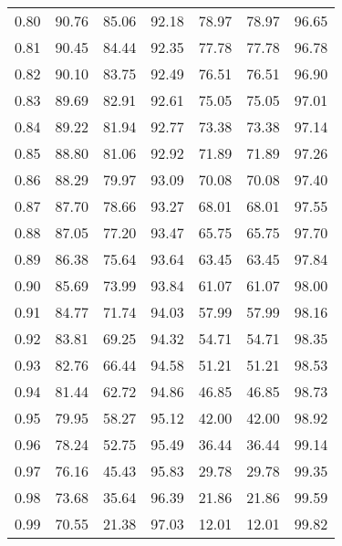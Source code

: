 \begin{tabular}{|c|c|c|c|c|c|c|}
      0.80 &     90.76 &     85.06 &      92.18 &   78.97 &      78.97 &         96.65 \\
      0.81 &     90.45 &     84.44 &      92.35 &   77.78 &      77.78 &         96.78 \\
      0.82 &     90.10 &     83.75 &      92.49 &   76.51 &      76.51 &         96.90 \\
      0.83 &     89.69 &     82.91 &      92.61 &   75.05 &      75.05 &         97.01 \\
      0.84 &     89.22 &     81.94 &      92.77 &   73.38 &      73.38 &         97.14 \\
      0.85 &     88.80 &     81.06 &      92.92 &   71.89 &      71.89 &         97.26 \\
      0.86 &     88.29 &     79.97 &      93.09 &   70.08 &      70.08 &         97.40 \\
      0.87 &     87.70 &     78.66 &      93.27 &   68.01 &      68.01 &         97.55 \\
      0.88 &     87.05 &     77.20 &      93.47 &   65.75 &      65.75 &         97.70 \\
      0.89 &     86.38 &     75.64 &      93.64 &   63.45 &      63.45 &         97.84 \\
      0.90 &     85.69 &     73.99 &      93.84 &   61.07 &      61.07 &         98.00 \\
      0.91 &     84.77 &     71.74 &      94.03 &   57.99 &      57.99 &         98.16 \\
      0.92 &     83.81 &     69.25 &      94.32 &   54.71 &      54.71 &         98.35 \\
      0.93 &     82.76 &     66.44 &      94.58 &   51.21 &      51.21 &         98.53 \\
      0.94 &     81.44 &     62.72 &      94.86 &   46.85 &      46.85 &         98.73 \\
      0.95 &     79.95 &     58.27 &      95.12 &   42.00 &      42.00 &         98.92 \\
      0.96 &     78.24 &     52.75 &      95.49 &   36.44 &      36.44 &         99.14 \\
      0.97 &     76.16 &     45.43 &      95.83 &   29.78 &      29.78 &         99.35 \\
      0.98 &     73.68 &     35.64 &      96.39 &   21.86 &      21.86 &         99.59 \\
      0.99 &     70.55 &     21.38 &      97.03 &   12.01 &      12.01 &         99.82 \\
\bottomrule
\end{tabular}
